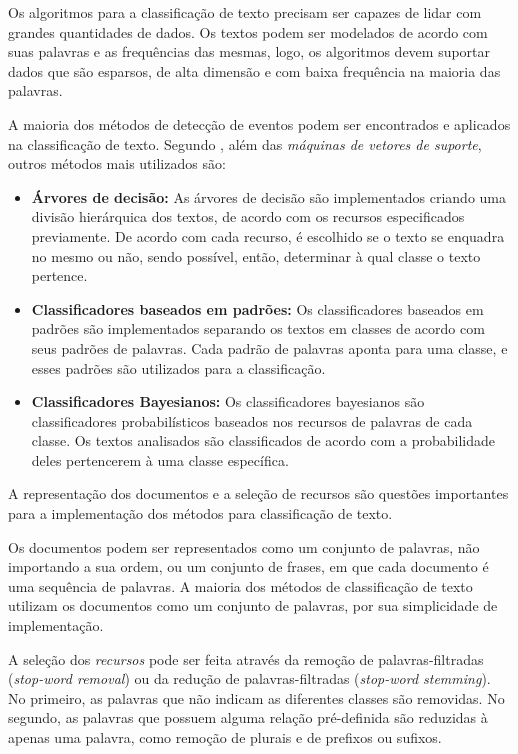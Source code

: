 Os algoritmos para a classificação de texto precisam ser capazes de lidar com grandes quantidades de dados. Os textos podem ser modelados de acordo com suas palavras e as frequências das mesmas, logo, os algoritmos devem suportar dados que são esparsos, de alta dimensão e com baixa frequência na maioria das palavras. 

A maioria dos métodos de detecção de eventos podem ser encontrados e aplicados na classificação de texto. Segundo , além das \textit{máquinas de vetores de suporte}, outros métodos mais utilizados são:

\begin{itemize}
	\item \textbf{Árvores de decisão:} As árvores de decisão são implementados criando uma divisão hierárquica dos textos, de acordo com os recursos especificados previamente. De acordo com cada recurso, é escolhido se o texto se enquadra no mesmo ou não, sendo possível, então, determinar à qual classe o texto pertence.
	\item \textbf{Classificadores baseados em padrões:}	Os classificadores baseados em padrões são implementados separando os textos em classes de acordo com seus padrões de palavras. Cada padrão de palavras aponta para uma classe, e esses padrões são utilizados para a classificação.
	\item \textbf{Classificadores Bayesianos:} Os classificadores bayesianos são classificadores probabilísticos baseados nos recursos de palavras de cada classe. Os textos analisados são classificados de acordo com a probabilidade deles pertencerem à uma classe específica.
\end{itemize}

A representação dos documentos e a seleção de recursos são questões importantes para a implementação dos métodos para classificação de texto. 

Os documentos podem ser representados como um conjunto de palavras, não importando a sua ordem, ou um conjunto de frases, em que cada documento é uma sequência de palavras. A maioria dos métodos de classificação de texto utilizam os documentos como um conjunto de palavras, por sua simplicidade de implementação.

A seleção dos \textit{recursos} pode ser feita através da remoção de palavras-filtradas (\textit{stop-word removal}) ou da redução de palavras-filtradas (\textit{stop-word stemming}). No primeiro, as palavras que não indicam as diferentes classes são removidas. No segundo, as palavras que possuem alguma relação pré-definida são reduzidas à apenas uma palavra, como remoção de plurais e de prefixos ou sufixos.

